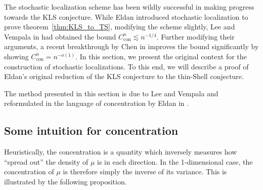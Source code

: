 The stochastic localization scheme has been wildly successful in making progress towards the KLS conjecture. 
While Eldan introduced stochastic localization to prove theorem~\ref{thm:KLS_to_TS}, 
modifying the scheme slightly, Lee and Vempala in \cite{Lee_2016} had obtained the bound 
\(C_{\text{con}}^n \lesssim n^{-1 / 4}\). Further modifying their arguments, a recent breakthrough by 
Chen in \cite{Chen_2020} improves the bound significantly by showing \(C_{\text{con}}^n = n^{-o(1)}\).
In this section, we present the original context for the construction of stochastic 
localizations. To this end, we will describe a proof of Eldan's original reduction of the KLS 
conjecture to the thin-Shell conjecture.

The method presented in this section is due to Lee and Vempala \cite{Lee_2016} and reformulated in 
the language of concentration by Eldan in \cite{Eldan_notes}.


\subsection{Some intuition for concentration}



Heuristically, the concentration is a quantity which inversely measures how ``spread out'' the density 
of \(\mu\) is in each direction. In the 1-dimensional case, the concentration of \(\mu\) is therefore 
simply the inverse of its variance. This is illustrated by the following proposition. 

